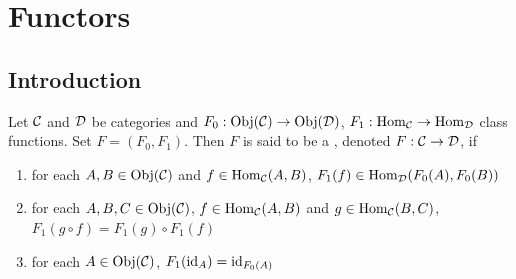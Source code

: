 \documentclass{book}
\begin{document}
	
	
	
	























































	
	
	

	
	
	
	
	
	
	
	
	
	
	
	
	
	
	
	
	
	
	
	
	
	
	
	
	
	
	\newpage
	\chapter{Functors}
	
	\section{Introduction}
	
	\begin{defn} 
		Let $\mathcal{C}$ and $\mathcal{D}$ be categories and $F_0 : \operatorname{Obj}(\mathcal{C}) \rightarrow \operatorname{Obj}(\mathcal{D})$, $F_1: \operatorname{Hom}_{\mathcal{C}} \rightarrow \operatorname{Hom}_{\mathcal{D}}$ class functions. Set $F = (F_0, F_1)$. Then $F$ is said to be a , denoted  $F:\mathcal{C} \rightarrow \mathcal{D}$, if 
		\begin{enumerate}
			\item for each $A,B \in \operatorname{Obj}(\mathcal{C})$ and $f \in \operatorname{Hom}_{\mathcal{C}}(A, B)$, $F_1(f) \in \operatorname{Hom}_{\mathcal{D}}(F_0(A), F_0(B))$
			\item for each $A,B, C \in \operatorname{Obj}(\mathcal{C})$, $f \in \operatorname{Hom}_{\mathcal{C}}(A,B)$ and $g \in \operatorname{Hom}_{\mathcal{C}}(B, C)$, $F_1(g \circ f) = F_1(g) \circ F_1(f)$
			\item for each $A \in \operatorname{Obj}(\mathcal{C})$,  $F_1(\operatorname{id}_A) = \operatorname{id}_{F_0(A)}$
		\end{enumerate}
	\end{defn}
	
\end{document}
